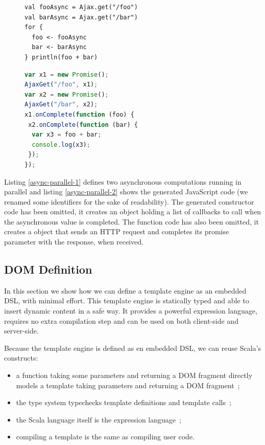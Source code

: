 \documentclass[american,english,runningheads]{llncs}
\begin{document}
\begin{figure}
\begin{multicols}{2}
\begin{lstlisting}[caption=Parallel computations in Scala,label=async-parallel-1]
val fooAsync = Ajax.get("/foo")
val barAsync = Ajax.get("/bar")
for {
  foo <- fooAsync
  bar <- barAsync
} println(foo + bar)
\end{lstlisting}
\vfill
\columnbreak
\begin{lstlisting}[language=JavaScript,caption=Generated JavaScript code,label=async-parallel-2]
var x1 = new Promise();
AjaxGet("/foo", x1);
var x2 = new Promise();
AjaxGet("/bar", x2);
x1.onComplete(function (foo) {
 x2.onComplete(function (bar) {
  var x3 = foo + bar;
  console.log(x3);
 });
});
\end{lstlisting}
\end{multicols}
\end{figure}

Listing \ref{async-parallel-1} defines two asynchronous computations running in parallel and listing
\ref{async-parallel-2} shows the generated JavaScript code (we renamed some identifiers for the sake of readability).
The generated  constructor code has been omitted, it creates an object holding a list of callbacks to
call when the asynchronous value is completed. The  function code has also been omitted, it creates a
 object that sends an HTTP request and completes its promise parameter with the response, when
received.

\subsection{DOM Definition}

In this section we show how we can define a template engine as an embedded DSL, with minimal effort. This template
engine is statically typed and able to insert dynamic content in a safe way. It provides a powerful expression
language, requires no extra compilation step and can be used on both client-side and server-side.

Because the template engine is defined as en embedded DSL, we can reuse Scala’s constructs:

\begin{itemize}
\item a function taking some parameters and returning a DOM fragment directly models a template taking parameters and
returning a DOM fragment~;
\item the type system typechecks template definitions and template calls~;
\item the Scala language itself is the expression language~;
\item compiling a template is the same as compiling user code.
\end{itemize}
\end{document}
